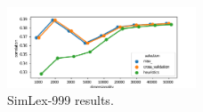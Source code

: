 \begin{figure}
  \centering
  \includegraphics[width=0.5\textwidth]{supplement/figures/SimLex999-results}
  \caption{SimLex-999 results.}
  \label{fig:SimLex999-results}
\end{figure}

